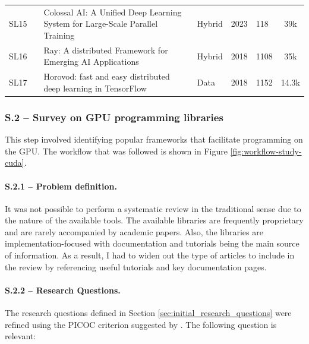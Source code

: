 \begin{table}[h!]
\begin{tabular}{llp{8.4cm}lllc}
		\small SL15        & \small \cite{li_colossal-ai_2023}       & \small Colossal AI: A Unified Deep Learning System for Large-Scale Parallel Training                             & \small Hybrid        & \small 2023          & \small 118                & \small 39k \cite{noauthor_hpcaitechcolossalai_2025}                  \\[1ex]
		\small SL16        & \small \cite{moritz_ray_2018}           & \small Ray: A distributed Framework for Emerging AI Applications                                                 & \small Hybrid        & \small 2018          & \small 1108               & \small 35k \cite{noauthor_ray-projectray_2025}                       \\[1ex]
		\small SL17        & \small \cite{sergeev_horovod_2018}      & \small Horovod: fast and easy distributed deep learning in TensorFlow                                            & \small Data          & \small 2018          & \small 1152               & \small 14.3k \cite{noauthor_horovodhorovod_2025}                     \\[1ex]
		\hline
	\end{tabular}
\end{table}

\subsubsection{S.2 -- Survey on GPU programming libraries}
\label{sec:gpu-programming-libraries}
This step involved identifying popular frameworks that facilitate programming on the GPU. The
workflow that was followed is shown in Figure \ref{fig:workflow-study-cuda}.

\paragraph{S.2.1 -- Problem definition.}
It was not possible to perform a systematic review in the traditional sense due to the nature of
the available tools. The available libraries are frequently proprietary and are rarely accompanied
by academic papers. Also, the libraries are implementation-focused with documentation and tutorials
being the main source of information. As a result, I had to widen out the type of articles to
include in the review by referencing useful tutorials and key documentation pages.

\paragraph{S.2.2 -- Research Questions.}
The research questions defined in Section \ref{sec:initial_research_questions} were refined using
the PICOC criterion suggested by \cite{keele_systematic_2007}. The following question is relevant:

